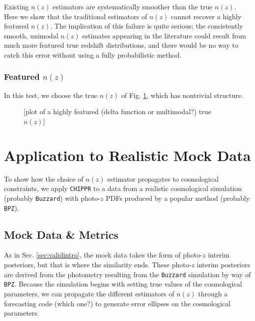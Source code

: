 \documentclass[iop]{emulateapj}
\newcommand{\chippr}{\texttt{CHIPPR} }
\begin{document}
Existing $n(z)$ estimators are systematically smoother than the true $n(z)$.  Here we show that the traditional estimators of $n(z)$ cannot recover a highly featured $n(z)$.  The implication of this failure is quite serious; the consistently smooth, unimodal $n(z)$ estimates appearing in the literature could result from much more featured true redshift distributions, and there would be no way to catch this error without using a fully probabilistic method.

\subsubsection{Featured $n(z)$}
\label{sec:featured}

In this test, we choose the true $n(z)$ of Fig. \ref{fig:featured}, which has nontrivial structure.

\begin{figure}
	\begin{center}
		\caption{[plot of a highly featured (delta function or multimodal?) true $n(z)$]}
		\label{fig:featured}
	\end{center}
\end{figure}

\section{Application to Realistic Mock Data}
\label{sec:application}

To show how the choice of $n(z)$ estimator propagates to cosmological constraints, we apply \chippr to a data from a realistic cosmological simulation (probably \texttt{Buzzard}) with photo-$z$ PDFs produced by a popular method (probably \texttt{BPZ}).

\subsection{Mock Data \& Metrics}
\label{sec:appintro}

As in Sec. \ref{sec:validintro}, the mock data takes the form of photo-$z$ interim posteriors, but that is where the similarity ends.  These photo-$z$ interim posteriors are derived from the photometry resulting from the \texttt{Buzzard} simulation by way of \texttt{BPZ}.  Because the simulation begins with setting true values of the cosmological parameters, we can propagate the different estimators of $n(z)$ through a forecasting code (which one?) to generate error ellipses on the cosmological parameters.
\end{document}
